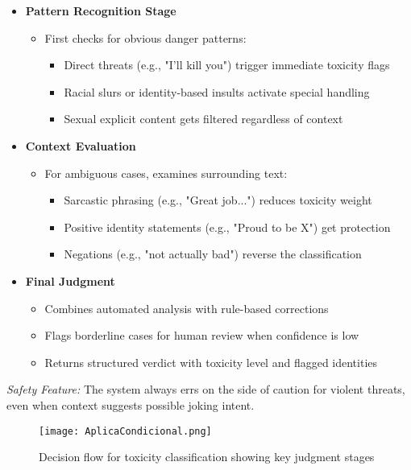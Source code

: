 \documentclass[conference]{IEEEtran}
\begin{document}
\begin{itemize}
    \item \textbf{Pattern Recognition Stage}
    \begin{itemize}
        \item First checks for obvious danger patterns:
        \begin{itemize}
            \item Direct threats (e.g., "I'll kill you") trigger immediate toxicity flags
            \item Racial slurs or identity-based insults activate special handling
            \item Sexual explicit content gets filtered regardless of context
        \end{itemize}
    \end{itemize}

    \item \textbf{Context Evaluation}
    \begin{itemize}
        \item For ambiguous cases, examines surrounding text:
        \begin{itemize}
            \item Sarcastic phrasing (e.g., "Great job...") reduces toxicity weight
            \item Positive identity statements (e.g., "Proud to be X") get protection
            \item Negations (e.g., "not actually bad") reverse the classification
        \end{itemize}
    \end{itemize}

    \item \textbf{Final Judgment}
    \begin{itemize}
        \item Combines automated analysis with rule-based corrections
        \item Flags borderline cases for human review when confidence is low
        \item Returns structured verdict with toxicity level and flagged identities
    \end{itemize}
\end{itemize}

\textit{Safety Feature:} The system always errs on the side of caution for violent threats, even when context suggests possible joking intent.

\begin{figure}[h]
    \centering
    \texttt{[image: AplicaCondicional.png]} 
    \caption{Decision flow for toxicity classification showing key judgment stages}
    \label{fig:classification_flow}
\end{figure}
\end{document}
